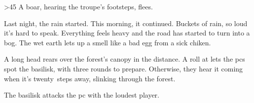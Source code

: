 \ifnum\thefenestraDay>45
  A boar, hearing the troupe's footsteps, flees.

  \boar
\else

  \begin{boxtext}
    Last night, the rain started.
    This morning, it continued.
    Buckets of rain, so loud it's hard to speak.
    Everything feels heavy and the road has started to turn into a bog.
    The wet earth lets up a smell like a bad egg from a sick chiken.
  \end{boxtext}

  A long head rears over the forest's canopy in the distance.  A
   roll at \tn[10] lets the \glspl{pc} spot the
  \gls{basilisk}, with three \glspl{round} to prepare.  Otherwise, they hear it
  coming when it's twenty~\glspl{step} away, slinking through the forest.

  The \gls{basilisk} attacks the \gls{pc} with the loudest player.

  \basilisk

\fi
